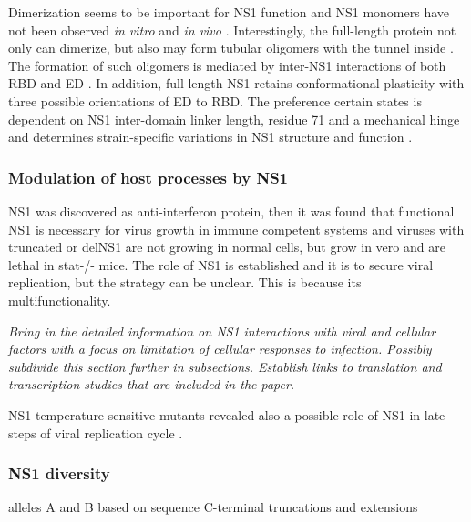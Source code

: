 		Dimerization seems to be important for \gls{NS1} function and \gls{NS1} monomers have not been observed \textit{in vitro} and \textit{in vivo} \parencite{Hale2014}. Interestingly, the full-length protein  not only can dimerize, but also may form tubular oligomers with the tunnel inside \parencite{Bornholdt2008}. The formation of such oligomers is mediated by inter-NS1 interactions of both \gls{RBD} and \gls{ED} \parencite{Bornholdt2008, Carrillo2014}. In addition, full-length \gls{NS1} retains conformational plasticity with three possible orientations of \gls{ED} to \gls{RBD}. The preference certain states is dependent on \gls{NS1} inter-domain linker length, residue 71 and a mechanical hinge and determines strain-specific variations in \gls{NS1} structure and function \parencite{Carrillo2014}.
		
		
		\subsubsection{Modulation of host processes by NS1}
		
		NS1 was discovered as anti-interferon protein, then it was found that functional NS1 is necessary for virus growth in immune competent systems and viruses with truncated or delNS1 are not growing in normal cells, but grow in vero and are lethal in stat-/- mice. The role of NS1 is established and it is to secure viral replication, but the strategy can be unclear. This is because its multifunctionality.
		
		\textit{Bring in the detailed information on NS1 interactions with viral and cellular factors with a focus on limitation of cellular responses to infection. Possibly subdivide this section further in subsections. Establish links to translation and transcription studies that are included in the paper.}
		
		NS1 temperature sensitive mutants revealed also a possible role of NS1 in late steps of viral replication cycle \parencite{Garaigorta2005}.
		
		\subsubsection{NS1 diversity}
		
		alleles A and B based on sequence
		C-terminal truncations and extensions
		
		
		
